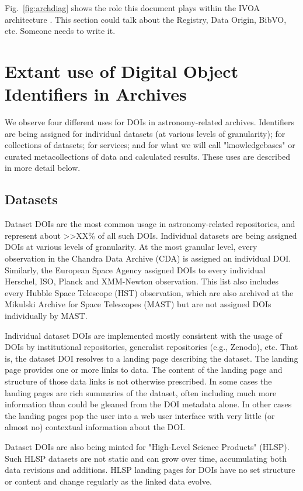 \documentclass[11pt,a4paper]{ivoa}
\begin{document}
Fig.~\ref{fig:archdiag} shows the role this document plays within the IVOA architecture \citep{2021ivoa.spec.1101D}.
This section could talk about the Registry, Data Origin, BibVO, etc. 
Someone needs to write it. 


\section{Extant use of Digital Object Identifiers in Archives}
\label{sec:usage}
We observe four different uses for DOIs in astronomy-related archives.
Identifiers are being assigned for individual datasets (at various levels of granularity); for collections of datasets; for services; and for what we will call "knowledgebases" or curated metacollections of data and calculated results. 
These uses are described in more detail below.

\subsection{Datasets}
\label{sec:intro:datasets}

Dataset DOIs are the most common usage in astronomy-related repositories, and represent about >>XX\% of all such DOIs.
Individual datasets are being assigned DOIs at various levels of granularity. 
At the most granular level, every observation in the Chandra Data Archive (CDA) is assigned an individual DOI.
Similarly, the European Space Agency assigned DOIs to every individual Herschel, ISO, Planck and XMM-Newton observation. 
This list also includes every Hubble Space Telescope (HST) observation, which are also archived at the Mikulski Archive for Space Telescopes (MAST) but are not assigned DOIs individually by MAST.

Individual dataset DOIs are implemented mostly consistent with the usage of DOIs by institutional repositories, generalist repositories (e.g., Zenodo), etc.
That is, the dataset DOI resolves to a landing page describing the dataset.
The landing page provides one or more links to data.
The content of the landing page and structure of those data links is not otherwise prescribed. 
In some cases the landing pages are rich summaries of the dataset, often including much more information than could be gleaned from the DOI metadata alone.
In other cases the landing pages pop the user into a web user interface with very little (or almost no) contextual information about the DOI. 

Dataset DOIs are also being minted for "High-Level Science Products" (HLSP). 
Such HLSP datasets are not static and can grow over time, accumulating both data revisions and additions.
HLSP landing pages for DOIs have no set structure or content and change regularly as the linked data evolve.
\end{document}
